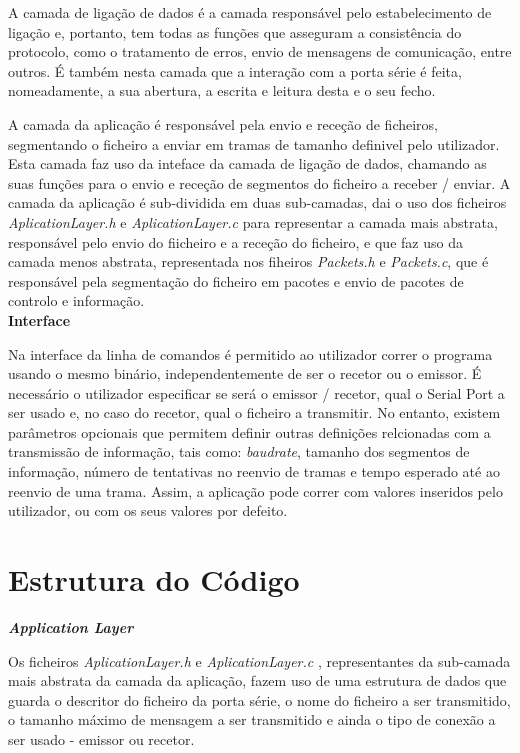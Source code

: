 \documentclass[a4paper, 11pt]{article}
\begin{document}
A camada de ligação de dados é a camada responsável pelo estabelecimento de ligação e, portanto, tem todas as funções que asseguram a consistência do protocolo, como o tratamento de erros, envio de mensagens de comunicação, entre outros. É também nesta camada que a interação com a porta série é feita, nomeadamente, a sua abertura, a escrita e leitura desta e o seu fecho.

A camada da aplicação é responsável pela envio e receção de ficheiros, segmentando o ficheiro a enviar em tramas de tamanho definivel pelo utilizador. Esta camada faz uso da inteface da camada de ligação de dados, chamando as suas funções para o envio e receção de segmentos do ficheiro a receber / enviar. A camada da aplicação é sub-dividida em duas sub-camadas, dai o uso dos ficheiros \textit{AplicationLayer.h} e \textit{AplicationLayer.c} para representar a camada mais abstrata, responsável pelo envio do fiicheiro e a receção do ficheiro, e que faz uso da camada menos abstrata, representada nos fiheiros  \textit{Packets.h} e \textit{Packets.c}, que é responsável pela segmentação do ficheiro em pacotes e envio de pacotes de controlo e informação.\\

\large\textbf{Interface}\\
\normalsize

Na interface da linha de comandos é permitido ao utilizador correr o programa usando o mesmo binário, independentemente de ser o recetor ou o emissor.
É necessário o utilizador especificar se será o emissor / recetor, qual o Serial Port a ser usado e, no caso do recetor, qual o ficheiro a transmitir. No entanto, existem parâmetros opcionais que permitem definir outras definições relcionadas com a transmissão de informação, tais como: \textit{baudrate}, tamanho dos segmentos de informação, número de tentativas no reenvio de tramas e tempo esperado até ao reenvio de uma trama.
Assim, a aplicação pode correr com valores inseridos pelo utilizador, ou com os seus valores por defeito.

\section{Estrutura do Código}

\large\textbf{\textit{Application Layer}}\\
\normalsize

Os ficheiros \textit{AplicationLayer.h} e \textit{AplicationLayer.c} , representantes da sub-camada mais abstrata da camada da aplicação, fazem uso de uma estrutura de dados que guarda o descritor do ficheiro da porta série, o nome do ficheiro a ser transmitido, o tamanho máximo de mensagem a ser transmitido e ainda o tipo de conexão a ser usado - emissor ou recetor.
\end{document}
